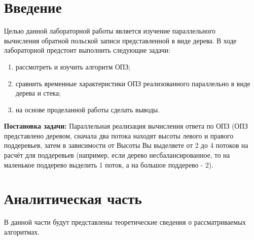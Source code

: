 \documentclass[a4paper, 12pt]{article}
\begin{document}
\tableofcontents
\clearpage
\newpage

\section*{Введение}


	\hspace*{5mm}Целью данной лабораторной работы является изучение параллельного вычисления обратной польской записи представленной в виде дерева.
	\newline \hspace*{5mm} В ходе лабораторной предстоит выполнить следующие задачи: 
	\begin{enumerate}
		\item рассмотреть и изучить алгоритм ОПЗ;
		\item сравнить временные характеристики ОПЗ реализованного параллельно в виде дерева и стека;
		\item на основе проделанной работы сделать выводы.
	\end{enumerate}
	\hspace*{5mm}\textbf{Постановка задачи:} Параллельная реализация вычисления ответа по ОПЗ (ОПЗ представлено деревом, сначала два потока находят высоты левого и правого поддеревьев, затем в зависимости от Высоты Вы выделяете от 2 до 4 потоков на расчёт для поддеревьев (например, если дерево несбалансированное, то на маленькое поддерево выделить 1 поток, а на большое поддерево - 2).
	
\clearpage
\newpage
\section{Аналитическая часть}
	\hspace*{5mm} В данной части будут представлены теоретические сведения о рассматриваемых алгоритмах.
\end{document}
